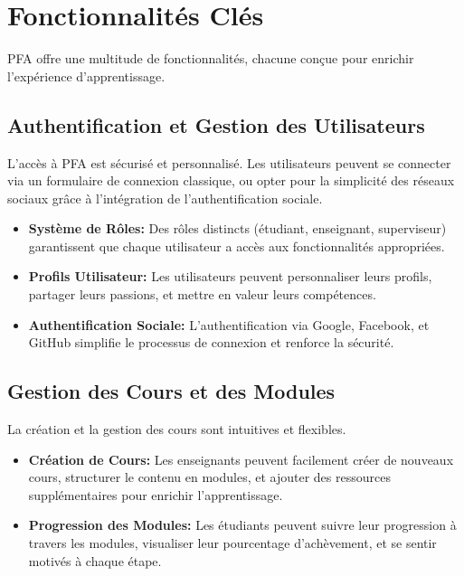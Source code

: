 \section{Fonctionnalités Clés}

PFA offre une multitude de fonctionnalités, chacune conçue pour enrichir l'expérience d'apprentissage.

\subsection{Authentification et Gestion des Utilisateurs}

L'accès à PFA est sécurisé et personnalisé. Les utilisateurs peuvent se connecter via un formulaire de connexion classique, ou opter pour la simplicité des réseaux sociaux grâce à l'intégration de l'authentification sociale.

\begin{itemize}
    \item \textbf{Système de Rôles:} Des rôles distincts (étudiant, enseignant, superviseur) garantissent que chaque utilisateur a accès aux fonctionnalités appropriées.
    \item \textbf{Profils Utilisateur:} Les utilisateurs peuvent personnaliser leurs profils, partager leurs passions, et mettre en valeur leurs compétences.
    \item \textbf{Authentification Sociale:} L'authentification via Google, Facebook, et GitHub simplifie le processus de connexion et renforce la sécurité.
\end{itemize}
\newpage
\subsection{Gestion des Cours et des Modules}

La création et la gestion des cours sont intuitives et flexibles.

\begin{itemize}
    \item \textbf{Création de Cours:} Les enseignants peuvent facilement créer de nouveaux cours, structurer le contenu en modules, et ajouter des ressources supplémentaires pour enrichir l'apprentissage.
    \item \textbf{Progression des Modules:} Les étudiants peuvent suivre leur progression à travers les modules, visualiser leur pourcentage d'achèvement, et se sentir motivés à chaque étape.
\end{itemize}

